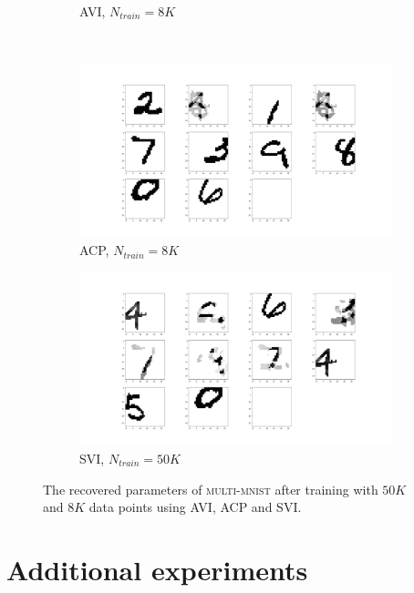 \documentclass[twoside]{article}
\begin{document}
\begin{figure}
\begin{subfigure}[t]{0.2\textwidth}
        \caption{AVI, $N_{train}=8K$}
        \label{fig: avi8000}
    \end{subfigure}%
    ~
    \begin{subfigure}[t]{0.2\textwidth}
        \centering
        \includegraphics[width=1.0\linewidth]{ubacp_8000.png}
        \caption{ACP, $N_{train}=8K$}
        \label{fig: ACP8000}
    \end{subfigure}%
    \begin{subfigure}[t]{0.2\textwidth}
        \centering
        \includegraphics[width=1.0\linewidth]{svi50000.png}
        \caption{SVI, $N_{train}=50K$}
        \label{fig: svi50000}
    \end{subfigure}
\caption{\small The recovered parameters of \textsc{multi-mnist} after training with $50K$ and $8K$ data points using AVI, ACP and SVI.}
\label{fig: parameter estimation multimnist}
\end{figure}

\section{Additional experiments}
\end{document}
